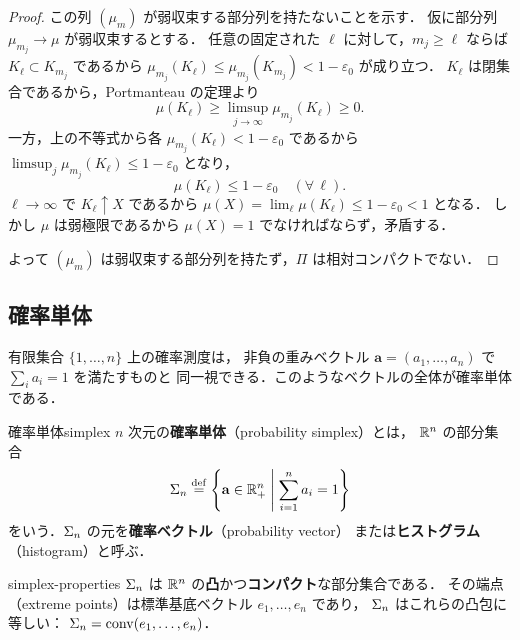 \begin{proof}
  この列 $(\mu_m)$ が弱収束する部分列を持たないことを示す．
  仮に部分列 $\mu_{m_j} \to \mu$ が弱収束するとする．
  任意の固定された $\ell$ に対して，$m_j \geq \ell$ ならば $K_\ell \subset K_{m_j}$ であるから
  $\mu_{m_j}(K_\ell) \leq \mu_{m_j}(K_{m_j}) < 1 - \varepsilon_0$ が成り立つ．
  $K_\ell$ は閉集合であるから，Portmanteau の定理より
  \[
    \mu(K_\ell) \geq \limsup_{j \to \infty} \mu_{m_j}(K_\ell) \geq 0.
  \]
  一方，上の不等式から各 $\mu_{m_j}(K_\ell) < 1 - \varepsilon_0$ であるから
  $\limsup_{j} \mu_{m_j}(K_\ell) \leq 1 - \varepsilon_0$ となり，
  \[
    \mu(K_\ell) \leq 1 - \varepsilon_0 \quad (\forall\, \ell).
  \]
  $\ell \to \infty$ で $K_\ell \uparrow X$ であるから
  $\mu(X) = \lim_\ell \mu(K_\ell) \leq 1 - \varepsilon_0 < 1$ となる．
  しかし $\mu$ は弱極限であるから $\mu(X) = 1$ でなければならず，矛盾する．

  よって $(\mu_m)$ は弱収束する部分列を持たず，$\Pi$ は相対コンパクトでない．
\end{proof}

\subsection{確率単体}
\label{subsec:simplex}

有限集合 $\{1, \ldots, n\}$ 上の確率測度は，
非負の重みベクトル $\mathbf{a} = (a_1, \ldots, a_n)$ で $\sum_i a_i = 1$ を満たすものと
同一視できる．このようなベクトルの全体が確率単体である．

\begin{definition}{確率単体}{simplex}
  $n$ 次元の\textbf{確率単体}（probability simplex）とは，
  $\mathbb{R}^n$ の部分集合
  \[
    \Sigma_n \overset{\mathrm{def}}{=}
    \left\{ \mathbf{a} \in \mathbb{R}_+^n \;\middle|\; \sum_{i=1}^n a_i = 1 \right\}
  \]
  をいう．$\Sigma_n$ の元を\textbf{確率ベクトル}（probability vector）
  または\textbf{ヒストグラム}（histogram）と呼ぶ．
\end{definition}

\begin{remark}{}{simplex-properties}
  $\Sigma_n$ は $\mathbb{R}^n$ の\textbf{凸}かつ\textbf{コンパクト}な部分集合である．
  その端点（extreme points）は標準基底ベクトル $e_1, \ldots, e_n$ であり，
  $\Sigma_n$ はこれらの凸包に等しい：
  $\Sigma_n = \operatorname{conv}(e_1, \ldots, e_n)$．
\end{remark}

